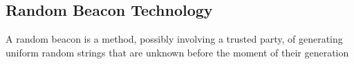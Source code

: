 \subsection{Random Beacon Technology}
A random beacon is a method, possibly involving a trusted party, of generating uniform random strings that are unknown before the moment of their generation %
